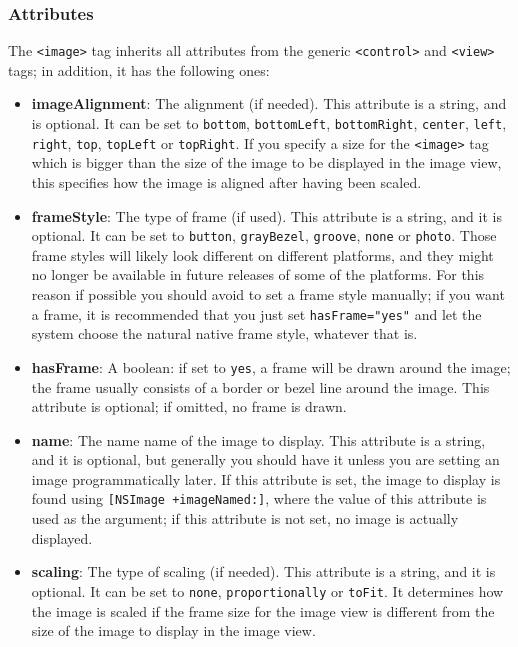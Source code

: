 \subsubsection{Attributes}
The \texttt{<image>} tag inherits all attributes from the generic
\texttt{<control>} and \texttt{<view>} tags; in addition, it has 
the following ones:
\begin{itemize}
\item {\bf imageAlignment}: The alignment (if needed).  This attribute
  is a string, and is optional.  It can be set to \texttt{bottom},
  \texttt{bottomLeft}, \texttt{bottomRight}, \texttt{center},
  \texttt{left}, \texttt{right}, \texttt{top}, \texttt{topLeft} or
  \texttt{topRight}.  If you specify a size for the \texttt{<image>}
  tag which is bigger than the size of the image to be displayed in
  the image view, this specifies how the image is aligned after having
  been scaled.
\item {\bf frameStyle}: The type of frame (if used).  This attribute
  is a string, and it is optional.  It can be set to \texttt{button},
  \texttt{grayBezel}, \texttt{groove}, \texttt{none} or
  \texttt{photo}.  Those frame styles will likely look different on
  different platforms, and they might no longer be available in future
  releases of some of the platforms.  For this reason if possible you
  should avoid to set a frame style manually; if you want a frame, it
  is recommended that you just set \texttt{hasFrame="yes"} and let the
  system choose the natural native frame style, whatever that is.
\item {\bf hasFrame}: A boolean: if set to \texttt{yes}, a frame will
  be drawn around the image; the frame usually consists of a border or
  bezel line around the image.  This attribute is optional; if
  omitted, no frame is drawn.
\item {\bf name}: The name name of the image to display.  This
  attribute is a string, and it is optional, but generally you should
  have it unless you are setting an image programmatically later.  If
  this attribute is set, the image to display is found using
  \texttt{[NSImage +imageNamed:]}, where the value of this attribute
  is used as the argument; if this attribute is not set, no image is
  actually displayed.
\item {\bf scaling}: The type of scaling (if needed).  This attribute
  is a string, and it is optional.  It can be set to \texttt{none},
  \texttt{proportionally} or \texttt{toFit}.  It determines how the
  image is scaled if the frame size for the image view is different
  from the size of the image to display in the image view.
\end{itemize}

